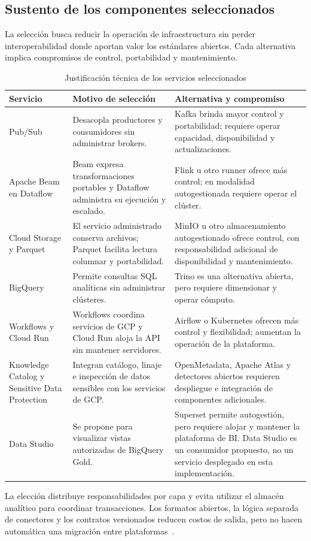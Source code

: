 \documentclass[11pt,a4paper]{article}
\begin{document}
\subsection{Sustento de los componentes seleccionados}
La selección busca reducir la operación de infraestructura sin perder interoperabilidad donde aportan valor los estándares abiertos. Cada alternativa implica compromisos de control, portabilidad y mantenimiento.
\begin{table}[H]
\caption{Justificación técnica de los servicios seleccionados}\label{tab:justificacion-tecnologica}
\small\begin{tabularx}{\linewidth}{@{}P{.22\linewidth}P{.36\linewidth}Y@{}}\toprule
Servicio & Motivo de selección & Alternativa y compromiso\\\midrule
Pub/Sub & Desacopla productores y consumidores sin administrar brokers. & Kafka brinda mayor control y portabilidad; requiere operar capacidad, disponibilidad y actualizaciones.\\
Apache Beam en Dataflow & Beam expresa transformaciones portables y Dataflow administra su ejecución y escalado. & Flink u otro runner ofrece más control; en modalidad autogestionada requiere operar el clúster.\\
Cloud Storage y Parquet & El servicio administrado conserva archivos; Parquet facilita lectura columnar y portabilidad. & MinIO u otro almacenamiento autogestionado ofrece control, con responsabilidad adicional de disponibilidad y mantenimiento.\\
BigQuery & Permite consultas SQL analíticas sin administrar clústeres. & Trino es una alternativa abierta, pero requiere dimensionar y operar cómputo.\\
Workflows y Cloud Run & Workflows coordina servicios de GCP y Cloud Run aloja la API sin mantener servidores. & Airflow o Kubernetes ofrecen más control y flexibilidad; aumentan la operación de la plataforma.\\
Knowledge Catalog y Sensitive Data Protection & Integran catálogo, linaje e inspección de datos sensibles con los servicios de GCP. & OpenMetadata, Apache Atlas y detectores abiertos requieren despliegue e integración de componentes adicionales.\\
Data Studio & Se propone para visualizar vistas autorizadas de BigQuery Gold. & Superset permite autogestión, pero requiere alojar y mantener la plataforma de BI. Data Studio es un consumidor propuesto, no un servicio desplegado en esta implementación.\\\bottomrule
\end{tabularx}
\end{table}
La elección distribuye responsabilidades por capa y evita utilizar el almacén analítico para coordinar transacciones. Los formatos abiertos, la lógica separada de conectores y los contratos versionados reducen costos de salida, pero no hacen automática una migración entre plataformas~\cite{pubsub,beam}.
\end{document}
